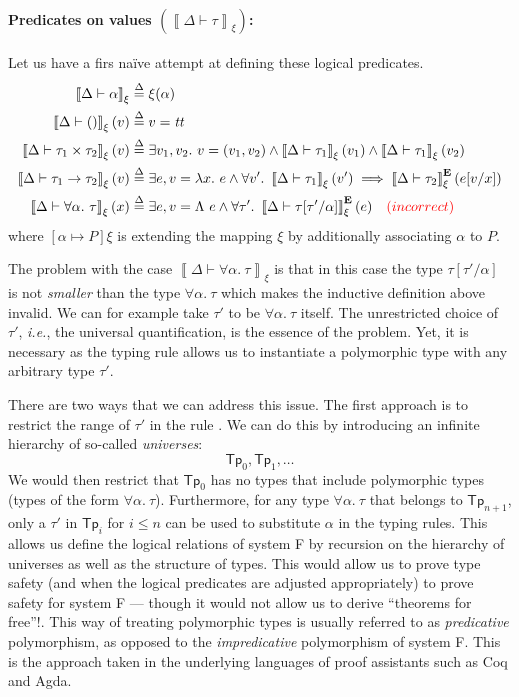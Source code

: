 \documentclass{article}
\newcommand{\ie}{\textit{i.e.}}
\newcommand{\TT}{\mathit{tt}}
\newcommand{\UNT}{()}
\newcommand{\defeq}{\overset{\Delta}{=}}
\newcommand{\semtyp}[3]{\left\llbracket #2 \vdash #3 \right\rrbracket_{#1}}
\newcommand{\semErel}[1]{#1^{\textbf{E}}}
\newcommand{\semenv}{\xi}
\newcommand{\TLam}{\Lambda}
\newcommand{\CtxTps}{\Delta}
\newcommand{\expr}{e}
\newcommand{\val}{v}
\newcommand{\var}{x}
\newcommand{\typ}{\tau}
\newcommand{\TForall}{\forall}
\newcommand{\tvar}{\alpha}
\begin{document}
\paragraph{Predicates on values $\left(\semtyp{\semenv}{\CtxTps}{\typ}\right)$:}
Let us have a firs na\"ive attempt at defining these logical
predicates.
\begin{align*}
\semtyp{\semenv}{\CtxTps}{\tvar} \defeq{}& \semenv(\tvar)\\
\semtyp{\semenv}{\CtxTps}{\UNT}(\val) \defeq{}& \val = \TT\\
\semtyp{\semenv}{\CtxTps}{\typ_1 \times \typ_2}(\val) \defeq{}& \exists \val_1, \val_2.~\val = (\val_1, \val_2) \land
\semtyp{\semenv}{\CtxTps}{\typ_1}(\val_1) \land \semtyp{\semenv}{\CtxTps}{\typ_1}(\val_2)\\
\semtyp{\semenv}{\CtxTps}{\typ_1 \to \typ_2}(\val) \defeq{}& \exists \expr, \val = \lambda \var.~\expr\land
\forall \val'.~\semtyp{\semenv}{\CtxTps}{\typ_1}(\val') \implies \semErel{\semtyp{\semenv}{\CtxTps}{\typ_2}}(\expr[\val/\var])\\
\semtyp{\semenv}{\CtxTps}{\TForall \tvar.~\typ}(\var) \defeq{}& \exists \expr, \val = \TLam~\expr\land
\forall \typ'.~\semErel{\semtyp{\semenv}{\CtxTps}{\typ[\typ'/\tvar]}}(\expr) \hspace{1em} {\color{red}(incorrect)}
\end{align*}
where $[\tvar \mapsto P]\semenv$ is extending the mapping $\semenv$ by additionally associating $\tvar$ to $P$.

The problem with the case $\semtyp{\semenv}{\CtxTps}{\TForall \tvar.~\typ}$ is that in this case the type $\typ[\typ'/\tvar]$ is not \emph{smaller} than the type $\TForall \tvar.~\typ$ which makes the inductive definition above invalid.
We can for example take $\typ'$ to be $\TForall \tvar.~\typ$ itself.
The unrestricted choice of $\typ'$, \ie{}, the universal quantification, is the essence of the problem.
Yet, it is necessary as the typing rule  allows us to instantiate a polymorphic type with any arbitrary type $\typ'$.

There are two ways that we can address this issue.
The first approach is to restrict the range of $\typ'$ in the rule .
We can do this by introducing an infinite hierarchy of so-called \emph{universes}:
\[\mathsf{Tp}_0, \mathsf{Tp}_1, \dots\]
We would then restrict that $\mathsf{Tp}_0$ has no types that include polymorphic types (types of the form $\TForall \tvar.~\typ$).
Furthermore, for any type $\TForall \tvar.~\typ$ that belongs to $\mathsf{Tp}_{n+1}$, only a $\typ'$ in $\mathsf{Tp}_i$ for $i \le n$ can be used to substitute $\tvar$ in the typing rules.
This allows us define the logical relations of system F by recursion on the hierarchy of universes as well as the structure of types.
This would allow us to prove type safety (and when the logical predicates are adjusted appropriately) to prove safety for system F --- though it would not allow us to derive ``theorems for free''!.
This way of treating polymorphic types is usually referred to as \emph{predicative} polymorphism, as opposed to the \emph{impredicative} polymorphism of system F.
This is the approach taken in the underlying languages of proof assistants such as Coq and Agda.
\end{document}
